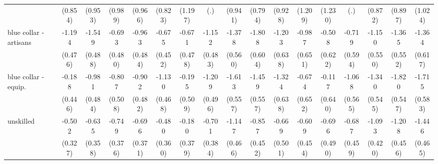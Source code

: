 {\begin{tabular}{l*{16}{c}}
                    &     (0.854)         &     (0.953)         &     (0.989)         &     (0.966)         &     (0.823)         &     (1.197)         &         (.)         &     (0.941)         &     (0.794)         &     (0.928)         &     (1.209)         &     (1.230)         &         (.)         &     (0.872)         &     (0.897)         &     (1.024)         \\
[1em]
blue collar - artisans&      -1.194\sym{*}  &      -1.549\sym{**} &      -0.693         &      -0.963\sym{*}  &      -0.675         &      -0.671         &      -1.152\sym{*}  &      -1.378\sym{*}  &      -1.808\sym{**} &      -1.203         &      -0.987         &      -0.508         &      -0.719         &      -1.150\sym{*}  &      -1.365\sym{*}  &      -1.364\sym{*}  \\
                    &     (0.476)         &     (0.488)         &     (0.480)         &     (0.484)         &     (0.452)         &     (0.478)         &     (0.483)         &     (0.560)         &     (0.604)         &     (0.638)         &     (0.651)         &     (0.622)         &     (0.594)         &     (0.550)         &     (0.552)         &     (0.617)         \\
[1em]
blue collar - equip.&      -0.188         &      -0.981\sym{*}  &      -0.807         &      -0.902         &      -1.130\sym{*}  &      -0.195         &      -1.209\sym{*}  &      -1.613\sym{**} &      -1.459\sym{**} &      -1.324\sym{*}  &      -0.674         &      -0.117         &      -1.068         &      -1.340\sym{*}  &      -1.820\sym{***}&      -1.715\sym{**} \\
                    &     (0.446)         &     (0.484)         &     (0.508)         &     (0.482)         &     (0.468)         &     (0.509)         &     (0.496)         &     (0.557)         &     (0.557)         &     (0.638)         &     (0.652)         &     (0.640)         &     (0.565)         &     (0.545)         &     (0.547)         &     (0.583)         \\
[1em]
unskilled           &      -0.502         &      -0.635         &      -0.749\sym{*}  &      -0.696         &      -0.480         &      -0.180         &      -0.701         &      -1.147\sym{*}  &      -0.857         &      -0.669         &      -0.609         &      -0.696         &      -0.687         &      -1.093\sym{**} &      -1.208\sym{**} &      -1.446\sym{**} \\
                    &     (0.327)         &     (0.358)         &     (0.376)         &     (0.371)         &     (0.360)         &     (0.379)         &     (0.384)         &     (0.466)         &     (0.452)         &     (0.501)         &     (0.454)         &     (0.490)         &     (0.459)         &     (0.420)         &     (0.456)         &     (0.465)         \\

\end{tabular}}
